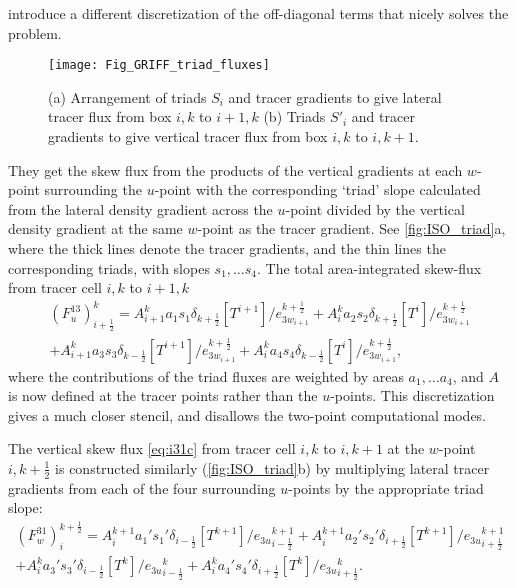 \documentclass[../main/NEMO_manual]{subfiles}
\begin{document}
\citep{Griffies_al_JPO98} introduce a different discretization of the off-diagonal terms that
nicely solves the problem.
\begin{figure}[tb]
  \begin{center}
    \texttt{[image: Fig\_GRIFF\_triad\_fluxes]}
    \caption{
      \protect\label{fig:ISO_triad}
      (a) Arrangement of triads $S_i$ and tracer gradients to
      give lateral tracer flux from box $i,k$ to $i+1,k$
      (b) Triads $S'_i$ and tracer gradients to give vertical tracer flux from
      box $i,k$ to $i,k+1$.
    }
  \end{center}
\end{figure}
They get the skew flux from the products of the vertical gradients at each $w$-point surrounding the $u$-point with
the corresponding `triad' slope calculated from the lateral density gradient across the $u$-point divided by
the vertical density gradient at the same $w$-point as the tracer gradient.
See \autoref{fig:ISO_triad}a, where the thick lines denote the tracer gradients,
and the thin lines the corresponding triads, with slopes $s_1, \dotsc s_4$.
The total area-integrated skew-flux from tracer cell $i,k$ to $i+1,k$
\begin{multline}
  \label{eq:i13}
  \left( F_u^{13}  \right)_{i+\frac{1}{2}}^k = {A}_{i+1}^k a_1 s_1
  \delta_{k+\frac{1}{2}} \left[ T^{i+1}
  \right]/e_{{3w}_{i+1}}^{k+\frac{1}{2}}  + {A} _i^k a_2 s_2 \delta
  _{k+\frac{1}{2}} \left[ T^i
  \right]/e_{{3w}_{i+1}}^{k+\frac{1}{2}} \\
  +{A} _{i+1}^k a_3 s_3 \delta_{k-\frac{1}{2}} \left[ T^{i+1}
  \right]/e_{{3w}_{i+1}}^{k+\frac{1}{2}}  +{A} _i^k a_4 s_4 \delta
  _{k-\frac{1}{2}} \left[ T^i \right]/e_{{3w}_{i+1}}^{k+\frac{1}{2}},
\end{multline}
where the contributions of the triad fluxes are weighted by areas $a_1, \dotsc a_4$,
and ${A}$ is now defined at the tracer points rather than the $u$-points.
This discretization gives a much closer stencil, and disallows the two-point computational modes.

The vertical skew flux \autoref{eq:i31c} from tracer cell $i,k$ to $i,k+1$ at
the $w$-point $i,k+\frac{1}{2}$ is constructed similarly (\autoref{fig:ISO_triad}b) by
multiplying lateral tracer gradients from each of the four surrounding $u$-points by the appropriate triad slope:
\begin{multline}
  \label{eq:i31}
  \left( F_w^{31} \right) _i ^{k+\frac{1}{2}} =  {A}_i^{k+1} a_{1}'
  s_{1}' \delta_{i-\frac{1}{2}} \left[ T^{k+1} \right]/{e_{3u}}_{i-\frac{1}{2}}^{k+1}
  +{A}_i^{k+1} a_{2}' s_{2}' \delta_{i+\frac{1}{2}} \left[ T^{k+1} \right]/{e_{3u}}_{i+\frac{1}{2}}^{k+1} \\
  + {A}_i^k a_{3}' s_{3}' \delta_{i-\frac{1}{2}} \left[ T^k\right]/{e_{3u}}_{i-\frac{1}{2}}^k
  +{A}_i^k a_{4}' s_{4}' \delta_{i+\frac{1}{2}} \left[ T^k \right]/{e_{3u}}_{i+\frac{1}{2}}^k.
\end{multline}
\end{document}
